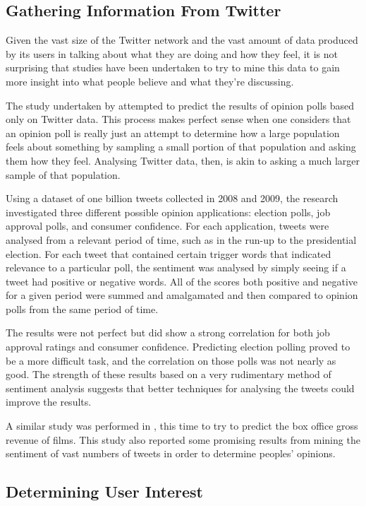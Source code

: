 \subsection{Gathering Information From Twitter}
\label{sec:InfoGatheringResearch}

Given the vast size of the Twitter network and the vast amount of data produced by its users in talking about what they are doing and how they feel, it is not surprising that studies have been undertaken to try to mine this data to gain more insight into what people believe and what they're discussing.

The study undertaken by \cite{O'Connor2010} attempted to predict the results of opinion polls based only on Twitter data. This process makes perfect sense when one considers that an opinion poll is really just an attempt to determine how a large population feels about something by sampling a small portion of that population and asking them how they feel. Analysing Twitter data, then, is akin to asking a much larger sample of that population.

Using a dataset of one billion tweets collected in 2008 and 2009, the research investigated three different possible opinion applications: election polls, job approval polls, and consumer confidence. For each application, tweets were analysed from a relevant period of time, such as in the run-up to the presidential election. For each tweet that contained certain trigger words that indicated relevance to a particular poll, the sentiment was analysed by simply seeing if a tweet had positive or negative words. All of the scores both positive and negative for a given period were summed and amalgamated and then compared to opinion polls from the same period of time.

The results were not perfect but did show a strong correlation for both job approval ratings and consumer confidence. Predicting election polling proved to be a more difficult task, and the correlation on those polls was not nearly as good. The strength of these results based on a very rudimentary method of sentiment analysis suggests that better techniques for analysing the tweets could improve the results.

A similar study was performed in \cite{Asur2010}, this time to try to predict the box office gross revenue of films. This study also reported some promising results from mining the sentiment of vast numbers of tweets in order to determine peoples' opinions.


\subsection{Determining User Interest}
\label{sec:UserInterestResearch}


